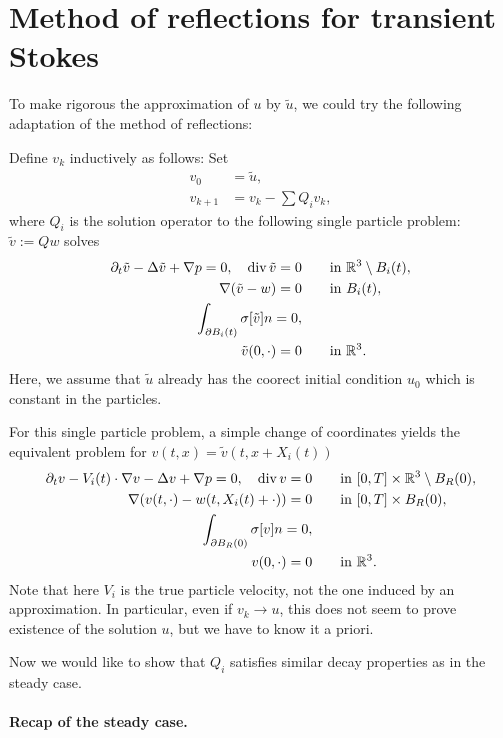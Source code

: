 \documentclass[abstracton, paper=a4, fontsize=11pt,DIV=12,bibliography=totoc]{scrartcl}
\begin{document}
\section{Method of reflections for transient Stokes}

To make rigorous the approximation of $u$ by $\tilde u$, we could try the following adaptation of the method of reflections:

Define $v_k$ inductively as follows: Set 
\begin{align}
    v_0 &= \tilde u, \\
    v_{k+1} &= v_k - \sum Q_i v_k, \label{v_k+1}
\end{align}
where $Q_i$ is the solution operator to the following single particle  problem: $\tilde v :=Q w$ solves 
\begin{align}
    \partial_t \tilde v - \Delta\tilde v + \nabla p = 0, \quad \operatorname{div} \tilde v = 0 & \qquad  \text{in }  \mathbb{R}^3 \setminus B_i(t), \\
    \nabla (\tilde v - w) = 0  & \qquad  \text{in } B_i(t), \\
    \int_{\partial B_i(t)} \sigma[\tilde v] n = 0, \\
    \tilde v(0,\cdot) = 0 & \qquad  \text{in }  \mathbb{R}^3.
\end{align}
Here, we assume that $\tilde u$ already has the coorect initial condition $u_0$ which is constant in the particles.

For this single particle problem, a simple change of coordinates yields the equivalent problem for $v(t,x) = \tilde v(t,x+X_i(t))$
\begin{align}
    \partial_t v - V_i(t) \cdot \nabla v -  \Delta v + \nabla p = 0, \quad \operatorname{div}  v = 0 & \qquad  \text{in }[0,
    T] \times  \mathbb{R}^3 \setminus B_R(0), \\
    \nabla (v(t,\cdot) - w(t,X_i(t) + \cdot)) = 0   & \qquad  \text{in } [0,
    T] \times B_R(0), \\
    \int_{\partial B_R(0)} \sigma[ v] n = 0, \\
        v(0,\cdot) = 0 & \qquad  \text{in }  \mathbb{R}^3.
\end{align}
Note that here $V_i$ is the true particle velocity, not the one induced by an approximation. In particular, even if $v_k \to u$, this does not seem to prove existence of the solution $u$, but we have to know it a priori. 

Now we would like to show that $Q_i$ satisfies similar decay properties as in the steady case. 

\paragraph{Recap of the steady case.}
\end{document}
